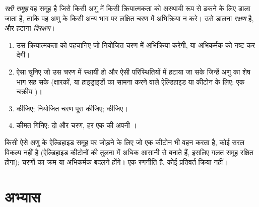 \begin{definition}[रक्षी समूह]\label{def:b1:acetals-protection:protecting-group}
\emph{रक्षी समूह} वह समूह है जिसे किसी अणु में
किसी क्रियात्मकता को अस्थायी रूप से ढकने के लिए डाला जाता है, ताकि वह अणु के
किसी अन्य भाग पर लक्षित चरण में अभिक्रिया न करे। उसे डालना
\emph{रक्षण} है, और हटाना
\emph{विरक्षण}।
\end{definition}

\begin{method}[रक्षण, अभिक्रिया, विरक्षण]\label{met:b1:acetals-protection:protect}
\begin{enumerate}
  \item उस क्रियात्मकता को पहचानिए जो नियोजित चरण में अभिक्रिया करेगी, या
        अभिकर्मक को नष्ट कर देगी।
  \item ऐसा  चुनिए जो उस चरण में स्थायी हो और ऐसी परिस्थितियों में हटाया जा सके
        जिन्हें अणु का शेष भाग सह सके (क्षारकों,  या हाइड्राइडों का
        सामना करने वाले ऐल्डिहाइड या कीटोन के लिए: एक चक्रीय )।
  \item {} कीजिए; नियोजित चरण पूरा कीजिए;  कीजिए।
  \item कीमत गिनिए: दो और चरण, हर एक की अपनी ।
\end{enumerate}
\end{method}

\begin{example}[बीच में आता एक कीटोन]\label{ex:b1:acetals-protection:ketoester}
किसी ऐसे अणु के ऐल्डिहाइड समूह पर  जोड़ने के लिए जो
एक कीटोन भी वहन करता है, कोई सरल  विकल्प नहीं है (ऐल्डिहाइड कीटोनों की तुलना में
अधिक आसानी से  बनाते हैं, इसलिए गलत समूह रक्षित होगा);
चरणों का क्रम या अभिकर्मक बदलने होंगे।  एक
रणनीति है, कोई प्रतिवर्त क्रिया नहीं।
\end{example}

\section{अभ्यास}

